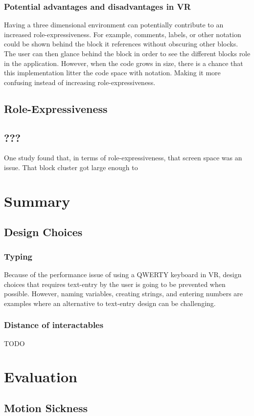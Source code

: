 \documentclass{sigchi}
\begin{document}
\subsubsection{Potential advantages and disadvantages in VR}
Having a three dimensional environment can potentially contribute to an increased role-expressiveness. For example, comments, labels, or other notation could be shown behind the block it references without obscuring other blocks. The user can then glance behind the block in order to see the different blocks role in the application. However, when the code grows in size, there is a chance that this implementation litter the code space with notation. Making it more confusing instead of increasing role-expressiveness.

\subsection{Role-Expressiveness}

\subsection{???}
One study found that, in terms of role-expressiveness, that screen space was an issue. That block cluster got large enough to

\section{Summary}
\subsection{Design Choices}
\subsubsection{Typing}
Because of the performance issue of using a QWERTY keyboard in VR, design choices that requires text-entry by the user is going to be prevented when possible. However, naming variables, creating strings, and entering numbers are examples where an alternative to text-entry design can be challenging.

\subsubsection{Distance of interactables}
TODO

\section{Evaluation}
\subsection{Motion Sickness}



\end{document}

